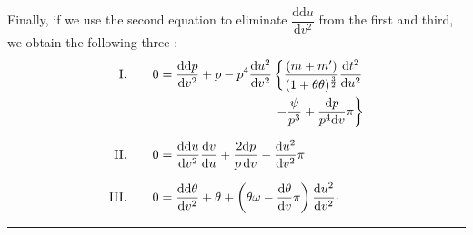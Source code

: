 \par\noindent Finally, if we use the second equation to eliminate
\(\dfrac{\mathrm{dd}u}{\mathrm{d}v^2}\) from the first and third, we obtain the following three
:
\[
\begin{aligned}
\mathrm{I.}\qquad0&=\frac{\mathrm{dd}p}{\mathrm{d}v^2}+p
 -p^4\frac{\mathrm{d}u^2}{\mathrm{d}v^2}
 \left\{\frac{(m+m')}{(1+\theta\theta)^{\frac{3}{2}}}
 \frac{\mathrm{d}t^2}{\mathrm{d}u^2}\right.\\
 &\hspace{9em}\left.-\frac{\psi}{p^3}
 +\frac{\mathrm{d}p}{p^4\mathrm{d}v}\pi\right\}\\[6pt]
\mathrm{II.}\qquad0&=\frac{\mathrm{dd}u}{\mathrm{d}v^2}\frac{\mathrm{d}v}{\mathrm{d}u}
 +\frac{2\mathrm{d}p}{p\,\mathrm{d}v}
 -\frac{\mathrm{d}u^2}{\mathrm{d}v^2}\pi\\[6pt]
\mathrm{III.}\qquad0&=\frac{\mathrm{dd}\theta}{\mathrm{d}v^2}+\theta
 +\left(\theta\omega-\frac{\mathrm{d}\theta}{\mathrm{d}v}\pi\right)
 \frac{\mathrm{d}u^2}{\mathrm{d}v^2}\mathpunct{\raisebox{.4ex}{.}}
\end{aligned}
\]
\begin{center}\rule{.9in}{.35pt}\end{center}
\clearpage
\endgroup
